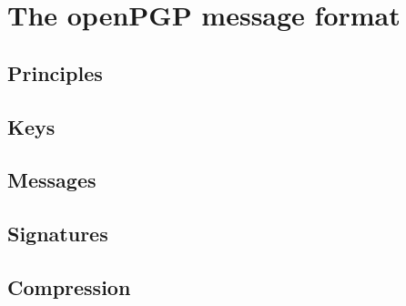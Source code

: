 \chapter{The openPGP message format}








\section{Principles}


\section{Keys}

\section{Messages}


\section{Signatures}

\section{Compression}

